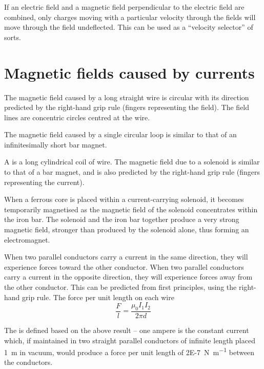 \documentclass[Physics.tex]{subfiles}
\begin{document}
If an electric field and a magnetic field perpendicular to the electric field are combined, only charges moving with a particular velocity through the fields will move through the field undeflected. This can be used as a ``velocity selector'' of sorts.
\section {Magnetic fields caused by currents}
The magnetic field caused by a long straight wire is circular with its direction predicted by the right-hand grip rule (fingers representing the field). The field lines are concentric circles centred at the wire.

The magnetic field caused by a single circular loop is similar to that of an infinitesimally short bar magnet.

A  is a long cylindrical coil of wire. The magnetic field due to a solenoid is similar to that of a bar magnet, and is also predicted by the right-hand grip rule (fingers representing the current).

When a ferrous core is placed within a current-carrying solenoid, it becomes temporarily magnetised as the magnetic field of the solenoid concentrates within the iron bar. The solenoid and the iron bar together produce a very strong magnetic field, stronger than produced by the solenoid alone, thus forming an electromagnet.

When two parallel conductors carry a current in the same direction, they will experience forces toward the other conductor. When two parallel conductors carry a current in the opposite direction, they will experience forces away from the other conductor. This can be predicted from first principles, using the right-hand grip rule. The force per unit length on each wire \begin{equation}\frac{F}{l} = \frac{\mu_0I_1I_2}{2\pi d}\end{equation}

The  is defined based on the above result -- one ampere is the constant current which, if maintained in two straight parallel conductors of infinite length placed \SI{1}{\metre} in vacuum, would produce a force per unit length of \SI{2E-7}{\newton\per\meter} between the conductors.
\end{document}
